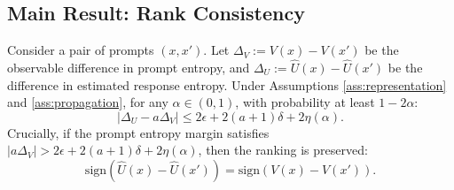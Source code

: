\subsection{Main Result: Rank Consistency}

\begin{theorem}
\label{thm:ranking-appendix}
Consider a pair of prompts $(x, x')$. Let $\Delta_V := V(x) - V(x')$ be the observable difference in prompt entropy, and $\Delta_U := \hat{U}(x) - \hat{U}(x')$ be the difference in estimated response entropy. Under Assumptions \ref{ass:representation} and \ref{ass:propagation}, for any $\alpha \in (0, 1)$, with probability at least $1-2\alpha$:
\begin{equation}
  |\Delta_U - a\Delta_V| \le 2\epsilon + 2(a+1)\delta + 2\eta(\alpha).
  \label{eq:theorem_bound-appendix}
\end{equation}
Crucially, if the prompt entropy margin satisfies $|a\Delta_V| > 2\epsilon + 2(a+1)\delta + 2\eta(\alpha)$, then the ranking is preserved:
\begin{equation}
  \text{sign}(\hat{U}(x) - \hat{U}(x')) = \text{sign}(V(x) - V(x')).
  \label{eq:theorem_order-appendix}
\end{equation}
\end{theorem}

